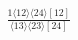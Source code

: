 \documentclass[varwidth, border=5pt]{standalone}
\begin{document}
\begin{my}
$\begin{gathered}
\scriptscriptstyle\frac{1⟨12⟩⟨24⟩[12]}{⟨13⟩⟨23⟩[24]}
\end{gathered}$
\end{my}
\end{document}
